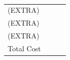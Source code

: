 \documentclass[12pt]{article} %
\begin{document}
\begin{itemize}
\begin{itemize}
\begin{itemize}
\begin{itemize}
\begin{itemize}
\begin{table}[h]
\begin{tabular}{llll}
		(EXTRA)                               &               &                   &                     \\
		(EXTRA)                               &               &                   &                     \\
		(EXTRA)                               &               &                   &                     \\ \bottomrule
		Total Cost                            &               &                   &                    
	\end{tabular}
	\caption{\label{tab:bomTable}}
\end{table}

%
%
%
%
%

\end{itemize}
\end{itemize}
\end{itemize}
\end{itemize}
\end{itemize}
\end{document}
